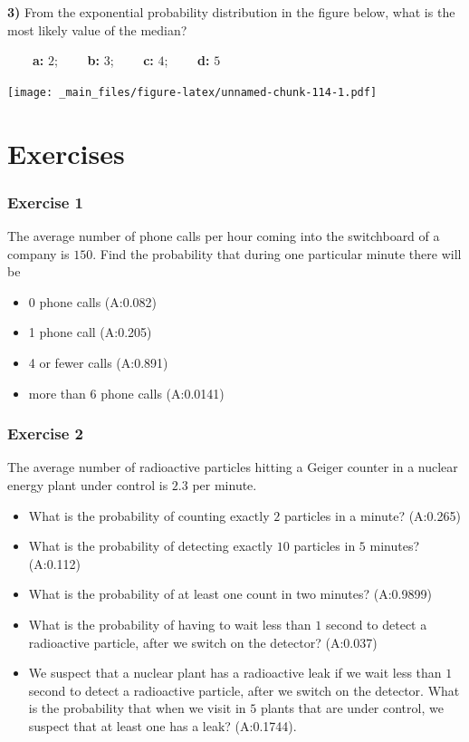 \documentclass[
]{book}
\providecommand{\tightlist}{%
  \setlength{\itemsep}{0pt}\setlength{\parskip}{0pt}}
\begin{document}
\textbf{3)} From the exponential probability distribution in the figure below, what is the most likely value of the median?

\textbf{\(\qquad\)a:} \(2\); \textbf{\(\qquad\)b:} \(3\); \textbf{\(\qquad\)c:} \(4\); \textbf{\(\qquad\)d:} \(5\)

\texttt{[image: \_main\_files/figure-latex/unnamed-chunk-114-1.pdf]}

\hypertarget{exercises-6}{%
\section{Exercises}\label{exercises-6}}

\hypertarget{exercise-1-5}{%
\subsubsection{Exercise 1}\label{exercise-1-5}}

The average number of phone calls per hour coming into the switchboard of a company is \(150\). Find the probability that during one particular minute there will be

\begin{itemize}
\tightlist
\item
  0 phone calls (A:0.082)
\item
  1 phone call (A:0.205)
\item
  4 or fewer calls (A:0.891)
\item
  more than 6 phone calls (A:0.0141)
\end{itemize}

\hypertarget{exercise-2-5}{%
\subsubsection{Exercise 2}\label{exercise-2-5}}

The average number of radioactive particles hitting a Geiger counter in a nuclear energy plant under control is \(2.3\) per minute.

\begin{itemize}
\item
  What is the probability of counting exactly \(2\) particles in a minute? (A:0.265)
\item
  What is the probability of detecting exactly \(10\) particles in \(5\) minutes? (A:0.112)
\item
  What is the probability of at least one count in two minutes? (A:0.9899)
\item
  What is the probability of having to wait less than \(1\) second to detect a radioactive particle, after we switch on the detector? (A:0.037)
\item
  We suspect that a nuclear plant has a radioactive leak if we wait less than \(1\) second to detect a radioactive particle, after we switch on the detector. What is the probability that when we visit in \(5\) plants that are under control, we suspect that at least one has a leak? (A:0.1744).
\end{itemize}
\end{document}
